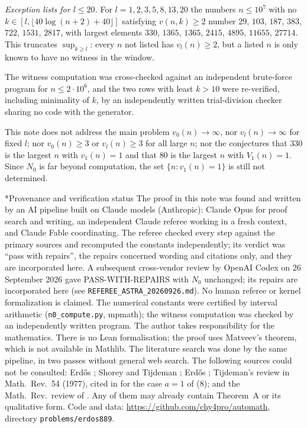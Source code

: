 \documentclass[10pt]{article}
\makeatletter
\numberwithin{equation}{section}
\theoremstyle{definition}
\theoremstyle{plain}
\renewcommand\section{\@startsection{section}{1}{\z@}{-2.6ex \@plus -.8ex \@minus -.2ex}{1.3ex \@plus .2ex}{\normalfont\large\bfseries}}
\renewcommand\subsection{\@startsection{subsection}{2}{\z@}{-2.2ex \@plus -.6ex \@minus -.2ex}{1ex \@plus .2ex}{\normalfont\normalsize\bfseries}}
\makeatother
\begin{document}
\emph{Exception lists for $l\le20$.} For $l=1,2,3,5,8,13,20$ the numbers $n\le10^7$ with no
$k\in[l,\lfloor40\log(n+2)+40\rfloor]$ satisfying $v(n,k)\ge2$ number $29$, $103$, $187$, $383$, $722$, $1531$,
$2817$, with largest elements $330$, $1365$, $1365$, $2415$, $4895$, $11655$, $27714$. This truncates
$\sup_{k\ge l}$: every $n$ not listed has $v_l(n)\ge2$, but a listed $n$ is only known to have no witness in the
window.

The witness computation was cross-checked against an independent brute-force program for $n\le2\cdot10^6$,
and the two rows with least $k>10$ were re-verified, including minimality of $k$, by an independently written
trial-division checker sharing no code with the generator.

\subsection{Open questions not addressed}\label{sec:open}
This note does not address the main problem $v_0(n)\to\infty$, nor $v_l(n)\to\infty$ for fixed $l$; nor
$v_0(n)\ge3$ or $v_l(n)\ge3$ for all large $n$; nor the conjectures that $330$ is the largest $n$ with $v_1(n)=1$
and that $80$ is the largest $n$ with $V_1(n)=1$. Since $N_0$ is far beyond computation, the set
$\{n:v_1(n)=1\}$ is still not determined.

\section*{Provenance and verification status}
The proof in this note was found and written by an AI pipeline built on Claude models (Anthropic): Claude Opus
for proof search and writing, an independent Claude referee working in a fresh context, and Claude Fable
coordinating. The referee checked every step against the primary sources and recomputed the constants
independently; its verdict was ``pass with repairs'', the repairs concerned wording and citations only, and they
are incorporated here. A subsequent cross-vendor review by OpenAI Codex on 26 September 2026 gave
PASS-WITH-REPAIRS with $N_0$ unchanged; its repairs are incorporated here (see
\texttt{REFEREE\_ASTRA\_20260926.md}). No human referee or kernel formalization is claimed.
The numerical constants were certified by interval arithmetic (\texttt{n0\_compute.py}, mpmath); the witness
computation was checked by an independently written program. The author takes responsibility for the
mathematics. There is no Lean formalisation; the proof uses Matveev's theorem, which is not available in Mathlib.
The literature search was done by the same pipeline, in two passes without general web search. The following
sources could not be consulted: Erd\H{o}s \cite[p.~178]{Er98}; Shorey and Tijdeman \cite{ST86}; Erd\H{o}s
\cite{Er76}; Tijdeman's review in Math.\ Rev.\ 54 (1977), cited in \cite{La81} for the case $a=1$ of (8); and the
Math.\ Rev.\ review of \cite{La81}. Any of them may already contain Theorem~A or its qualitative form. Code and
data: \url{https://github.com/chy4pro/automath}, directory \texttt{problems/erdos889}.
\end{document}
